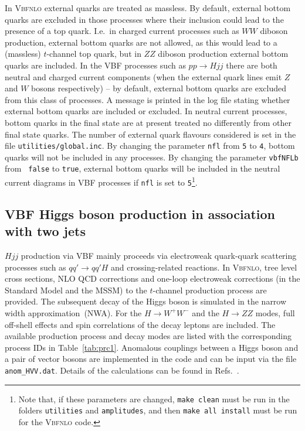 \documentclass[english,12pt]{article}
\begin{document}
In \textsc{Vbfnlo} external quarks are treated as massless.  By default,
external bottom quarks are excluded in those processes where their inclusion could lead to
the presence of a top quark.  I.e.\ in charged current processes such as $WW$
diboson production, external bottom quarks are not allowed, as this would lead
to a (massless) $t$-channel top quark, but in $ZZ$ diboson production external
bottom quarks are included.  In the VBF processes such as $pp \rightarrow Hjj$
there are both neutral and charged current components (when the external quark
lines emit $Z$ and $W$ bosons respectively) -- by default, external bottom
quarks are excluded from this class of processes.  A message is printed in the
log file stating whether external bottom quarks are included or excluded.  In
neutral current processes, bottom quarks in the final state are at present
treated no differently from other final state quarks.  The number of external
quark flavours considered is set in the file {\tt utilities/global.inc}.  By
changing the parameter {\tt nfl} from {\tt 5} to {\tt 4}, bottom quarks will not
be included in any processes.  By changing the parameter {\tt vbfNFLb} from {\tt
false} to {\tt true}, external bottom quarks will be included in the neutral
current diagrams in VBF processes if {\tt nfl} is set to {\tt 5}\footnote{Note
that, if these parameters are changed, {\tt make clean} must be run in
the folders {\tt utilities} and {\tt amplitudes}, and then {\tt make all
install} must be run for the \textsc{Vbfnlo} code.}.



\subsection{VBF Higgs boson production in association with two jets}
\label{sec:vbf-hjj}

$Hjj$ production via VBF mainly proceeds via electroweak quark-quark scattering
processes such as $qq'\to qq'H$ and crossing-related reactions. In
\textsc{Vbfnlo}, tree level cross sections, NLO QCD corrections and one-loop
electroweak corrections (in the Standard Model and the MSSM) to the $t$-channel
production process are provided. The subsequent decay of the Higgs boson is
simulated in the narrow width approximation~(NWA). For the $H\to W^+W^- $ and
the $H\to ZZ$ modes, full off-shell effects and spin correlations of the decay
leptons are included.   The available production process and decay modes are
listed with the corresponding process IDs in Table~\ref{tab:prc1}.  Anomalous
couplings between a Higgs boson and a pair of vector bosons are implemented in the
code and can be input via the file {\tt anom\_HVV.dat}.  Details of the 
calculations can be found in Refs.~\cite{Figy:2003nv,Hollik:2008xn,Figy:2010ct}. 
\end{document}
